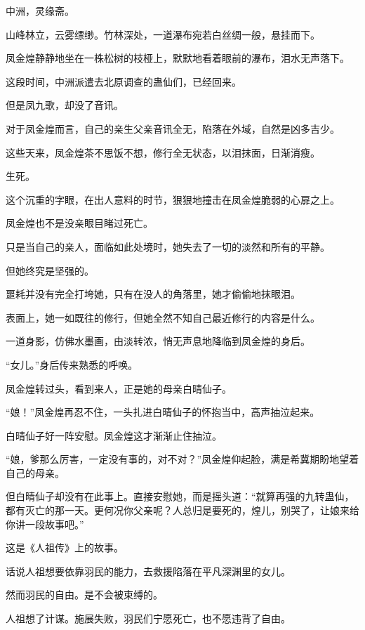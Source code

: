 
\begin{this_body}

中洲，灵缘斋。

山峰林立，云雾缥缈。竹林深处，一道瀑布宛若白丝绸一般，悬挂而下。

凤金煌静静地坐在一株松树的枝桠上，默默地看着眼前的瀑布，泪水无声落下。

这段时间，中洲派遣去北原调查的蛊仙们，已经回来。

但是凤九歌，却没了音讯。

对于凤金煌而言，自己的亲生父亲音讯全无，陷落在外域，自然是凶多吉少。

这些天来，凤金煌茶不思饭不想，修行全无状态，以泪抹面，日渐消瘦。

生死。

这个沉重的字眼，在出人意料的时节，狠狠地撞击在凤金煌脆弱的心扉之上。

凤金煌也不是没亲眼目睹过死亡。

只是当自己的亲人，面临如此处境时，她失去了一切的淡然和所有的平静。

但她终究是坚强的。

噩耗并没有完全打垮她，只有在没人的角落里，她才偷偷地抹眼泪。

表面上，她一如既往的修行，但她全然不知自己最近修行的内容是什么。

一道身影，仿佛水墨画，由淡转浓，悄无声息地降临到凤金煌的身后。

“女儿。”身后传来熟悉的呼唤。

凤金煌转过头，看到来人，正是她的母亲白晴仙子。

“娘！”凤金煌再忍不住，一头扎进白晴仙子的怀抱当中，高声抽泣起来。

白晴仙子好一阵安慰。凤金煌这才渐渐止住抽泣。

“娘，爹那么厉害，一定没有事的，对不对？”凤金煌仰起脸，满是希冀期盼地望着自己的母亲。

但白晴仙子却没有在此事上。直接安慰她，而是摇头道：“就算再强的九转蛊仙，都有灭亡的那一天。更何况你父亲呢？人总归是要死的，煌儿，别哭了，让娘来给你讲一段故事吧。”

这是《人祖传》上的故事。

话说人祖想要依靠羽民的能力，去救援陷落在平凡深渊里的女儿。

然而羽民的自由。是不会被束缚的。

人祖想了计谋。施展失败，羽民们宁愿死亡，也不愿违背了自由。


\end{this_body}
